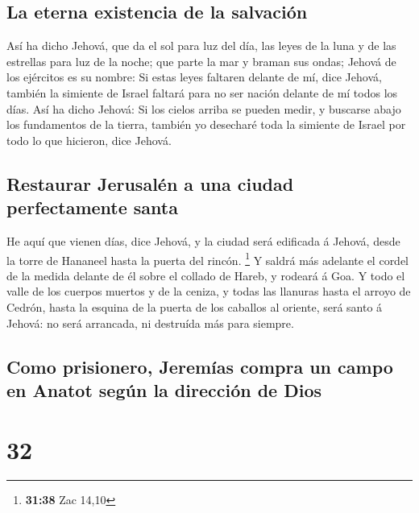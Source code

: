 \hypertarget{la-eterna-existencia-de-la-salvaciuxf3n}{%
\subsection{La eterna existencia de la
salvación}\label{la-eterna-existencia-de-la-salvaciuxf3n}}

 Así ha dicho Jehová, que da el sol para luz del día, las
leyes de la luna y de las estrellas para luz de la noche; que parte la
mar y braman sus ondas; Jehová de los ejércitos es su nombre:
 Si estas leyes faltaren delante de mí, dice Jehová,
también la simiente de Israel faltará para no ser nación delante de mí
todos los días.  Así ha dicho Jehová: Si los cielos
arriba se pueden medir, y buscarse abajo los fundamentos de la tierra,
también yo desecharé toda la simiente de Israel por todo lo que
hicieron, dice Jehová.

\hypertarget{restaurar-jerusaluxe9n-a-una-ciudad-perfectamente-santa}{%
\subsection{Restaurar Jerusalén a una ciudad perfectamente
santa}\label{restaurar-jerusaluxe9n-a-una-ciudad-perfectamente-santa}}

 He aquí que vienen días, dice Jehová, y la ciudad será
edificada á Jehová, desde la torre de Hananeel hasta la puerta del
rincón. \footnote{\textbf{31:38} Zac 14,10}  Y saldrá más
adelante el cordel de la medida delante de él sobre el collado de Hareb,
y rodeará á Goa.  Y todo el valle de los cuerpos muertos
y de la ceniza, y todas las llanuras hasta el arroyo de Cedrón, hasta la
esquina de la puerta de los caballos al oriente, será santo á Jehová: no
será arrancada, ni destruída más para siempre.

\hypertarget{como-prisionero-jeremuxedas-compra-un-campo-en-anatot-seguxfan-la-direcciuxf3n-de-dios}{%
\subsection{Como prisionero, Jeremías compra un campo en Anatot según la
dirección de
Dios}\label{como-prisionero-jeremuxedas-compra-un-campo-en-anatot-seguxfan-la-direcciuxf3n-de-dios}}

\hypertarget{section-31}{%
\section{32}\label{section-31}}

